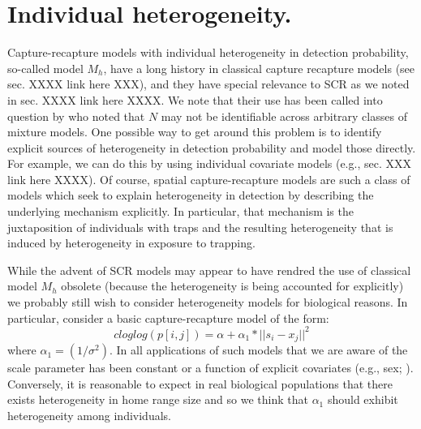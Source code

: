 \section{Individual heterogeneity.}

Capture-recapture models with individual heterogeneity in detection
probability, so-called model $M_{h}$, have a long history in classical
capture recapture models (see sec. XXXX link here XXX), and they have
special relevance to SCR as we noted in sec. XXXX link here XXXX.  We
note that their use has been called into question by \citet{link:2003}
who noted that $N$ may not be identifiable across arbitrary classes of
mixture models.  One possible way to get around this problem is to
identify explicit sources of heterogeneity in detection probability
and model those directly. For example, we can do this by using
individual covariate models (e.g., sec. XXX link here XXXX). Of
course, spatial capture-recapture models are such a class of models
which seek to explain heterogeneity in detection by describing the
underlying mechanism explicitly. In particular, that mechanism is the
juxtaposition of individuals with traps and the resulting
heterogeneity that is induced by heterogeneity in exposure to
trapping.



While the advent of SCR models may appear to have rendred the use of
classical model $M_h$ obsolete (because the heterogeneity is being
accounted for explicitly) we probably still wish to consider
heterogeneity models for biological reasons.
In particular, consider a basic capture-recapture model of the form:
\[
 cloglog(p[i,j]) = \alpha + \alpha_1*||s_{i} - x_{j}||^2
\]
where $\alpha_{1} = (1/\sigma^{2})$.  
In all applications of such models that we are aware of the scale
parameter has been constant or a function of explicit covariates
(e.g., sex; \citet{gardner_etal:2010}). Conversely, it is reasonable
to expect in real biological populations that there exists
heterogeneity in home range size and so we think that $\alpha_{1}$
should exhibit heterogeneity among individuals. 

